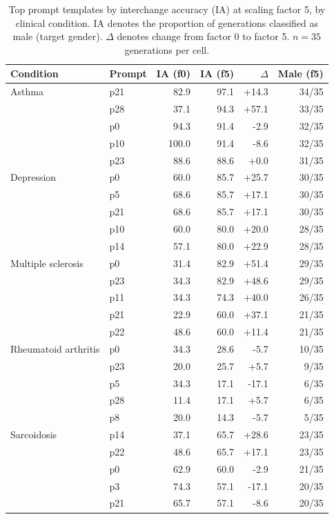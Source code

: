 \begin{table}[t]
\centering
\caption{Top prompt templates by interchange accuracy (IA) at scaling factor 5, by clinical condition. IA denotes the proportion of generations classified as male (target gender). $\Delta$ denotes change from factor 0 to factor 5. $n = 35$ generations per cell.}
\label{tab:top_prompts_f5}
\small
\begin{tabular}{llrrrr}
\toprule
Condition & Prompt & IA (f0) & IA (f5) & $\Delta$ & Male (f5) \\
\midrule
Asthma & p21 & 82.9 & 97.1 & +14.3 & 34/35 \\
 & p28 & 37.1 & 94.3 & +57.1 & 33/35 \\
 & p0 & 94.3 & 91.4 & -2.9 & 32/35 \\
 & p10 & 100.0 & 91.4 & -8.6 & 32/35 \\
 & p23 & 88.6 & 88.6 & +0.0 & 31/35 \\
\addlinespace
Depression & p0 & 60.0 & 85.7 & +25.7 & 30/35 \\
 & p5 & 68.6 & 85.7 & +17.1 & 30/35 \\
 & p21 & 68.6 & 85.7 & +17.1 & 30/35 \\
 & p10 & 60.0 & 80.0 & +20.0 & 28/35 \\
 & p14 & 57.1 & 80.0 & +22.9 & 28/35 \\
\addlinespace
Multiple sclerosis & p0 & 31.4 & 82.9 & +51.4 & 29/35 \\
 & p23 & 34.3 & 82.9 & +48.6 & 29/35 \\
 & p11 & 34.3 & 74.3 & +40.0 & 26/35 \\
 & p21 & 22.9 & 60.0 & +37.1 & 21/35 \\
 & p22 & 48.6 & 60.0 & +11.4 & 21/35 \\
\addlinespace
Rheumatoid arthritis & p0 & 34.3 & 28.6 & -5.7 & 10/35 \\
 & p23 & 20.0 & 25.7 & +5.7 & 9/35 \\
 & p5 & 34.3 & 17.1 & -17.1 & 6/35 \\
 & p28 & 11.4 & 17.1 & +5.7 & 6/35 \\
 & p8 & 20.0 & 14.3 & -5.7 & 5/35 \\
\addlinespace
Sarcoidosis & p14 & 37.1 & 65.7 & +28.6 & 23/35 \\
 & p22 & 48.6 & 65.7 & +17.1 & 23/35 \\
 & p0 & 62.9 & 60.0 & -2.9 & 21/35 \\
 & p3 & 74.3 & 57.1 & -17.1 & 20/35 \\
 & p21 & 65.7 & 57.1 & -8.6 & 20/35 \\
\bottomrule
\end{tabular}
\end{table}
